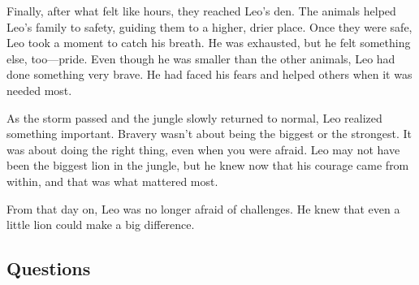 \documentclass[12pt]{article}
\begin{document}
\begin{tcolorbox}[colframe=black!40, colback=gray!5]
\begin{spacing}{1.15}
Finally, after what felt like hours, they reached Leo’s den. The animals helped Leo’s family to safety, guiding them to a higher, drier place. Once they were safe, Leo took a moment to catch his breath. He was exhausted, but he felt something else, too—pride. Even though he was smaller than the other animals, Leo had done something very brave. He had faced his fears and helped others when it was needed most.

As the storm passed and the jungle slowly returned to normal, Leo realized something important. Bravery wasn’t about being the biggest or the strongest. It was about doing the right thing, even when you were afraid. Leo may not have been the biggest lion in the jungle, but he knew now that his courage came from within, and that was what mattered most.

From that day on, Leo was no longer afraid of challenges. He knew that even a little lion could make a big difference.

 

\end{spacing}

\end{tcolorbox}


\subsection*{Questions}
\end{document}
